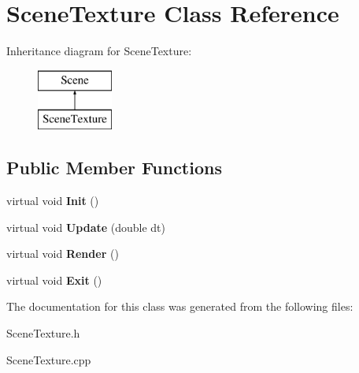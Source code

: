 \hypertarget{class_scene_texture}{\section{Scene\+Texture Class Reference}
\label{class_scene_texture}
}
Inheritance diagram for Scene\+Texture\+:\begin{figure}[H]
\begin{center}
\leavevmode
\includegraphics[height=2.000000cm]{class_scene_texture}
\end{center}
\end{figure}
\subsection*{Public Member Functions}
\begin{DoxyCompactItemize}
\item 
\hypertarget{class_scene_texture_a8499b9b84a1509327e29fa5f7899ec58}{virtual void {\bfseries Init} ()}\label{class_scene_texture_a8499b9b84a1509327e29fa5f7899ec58}

\item 
\hypertarget{class_scene_texture_ae7ca4466bb1a3db856c91d714b655253}{virtual void {\bfseries Update} (double dt)}\label{class_scene_texture_ae7ca4466bb1a3db856c91d714b655253}

\item 
\hypertarget{class_scene_texture_ad9009aa06a8d335485a624089ef134f3}{virtual void {\bfseries Render} ()}\label{class_scene_texture_ad9009aa06a8d335485a624089ef134f3}

\item 
\hypertarget{class_scene_texture_aa4771e4c33cef692c7f8520553b680a6}{virtual void {\bfseries Exit} ()}\label{class_scene_texture_aa4771e4c33cef692c7f8520553b680a6}

\end{DoxyCompactItemize}


The documentation for this class was generated from the following files\+:\begin{DoxyCompactItemize}
\item 
Scene\+Texture.\+h\item 
Scene\+Texture.\+cpp\end{DoxyCompactItemize}
